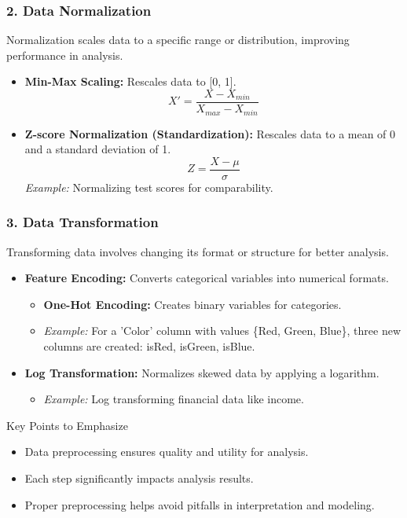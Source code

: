 \documentclass[aspectratio=169]{beamer}
\begin{document}
\begin{frame}[fragile]
    \frametitle{2. Data Normalization}
    Normalization scales data to a specific range or distribution, improving performance in analysis.
    \begin{itemize}
        \item \textbf{Min-Max Scaling:} Rescales data to [0, 1].
        \begin{equation}
        X' = \frac{X - X_{min}}{X_{max} - X_{min}}
        \end{equation}
        
        \item \textbf{Z-score Normalization (Standardization):} Rescales data to a mean of 0 and a standard deviation of 1.
        \begin{equation}
        Z = \frac{X - \mu}{\sigma}
        \end{equation}
        \textit{Example:} Normalizing test scores for comparability.
    \end{itemize}
\end{frame}

\begin{frame}[fragile]
    \frametitle{3. Data Transformation}
    Transforming data involves changing its format or structure for better analysis.
    \begin{itemize}
        \item \textbf{Feature Encoding:} Converts categorical variables into numerical formats.
            \begin{itemize}
                \item \textbf{One-Hot Encoding:} Creates binary variables for categories.
                \item \textit{Example:} For a 'Color' column with values \{Red, Green, Blue\}, three new columns are created: isRed, isGreen, isBlue.
            \end{itemize}
        \item \textbf{Log Transformation:} Normalizes skewed data by applying a logarithm.
            \begin{itemize}
                \item \textit{Example:} Log transforming financial data like income.
            \end{itemize}
    \end{itemize}

    \begin{block}{Key Points to Emphasize}
        \begin{itemize}
            \item Data preprocessing ensures quality and utility for analysis.
            \item Each step significantly impacts analysis results.
            \item Proper preprocessing helps avoid pitfalls in interpretation and modeling.
        \end{itemize}
    \end{block}
\end{frame}
\end{document}
